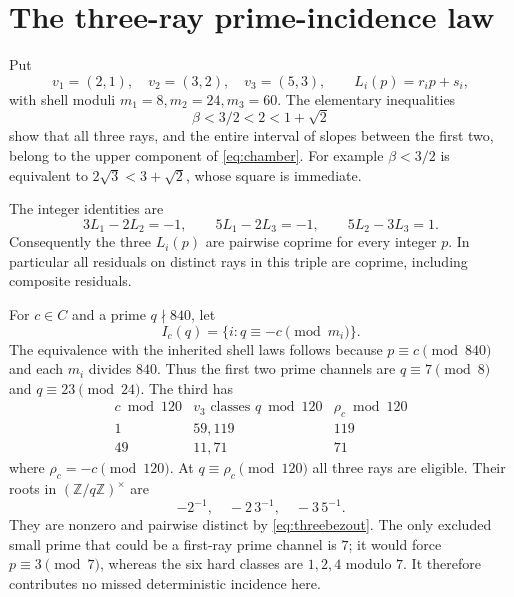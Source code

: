 \documentclass[11pt]{article}
\theoremstyle{remark}\newtheorem{remark}[theorem]{Remark}
\newcommand{\Z}{\mathbb Z}
\begin{document}
\section{The three-ray prime-incidence law}\label{sec:local}
Put
\[
 v_1=(2,1),\quad v_2=(3,2),\quad v_3=(5,3),\qquad
 L_i(p)=r_ip+s_i,
\]
with shell moduli $m_1=8,m_2=24,m_3=60$. The elementary inequalities
\[
 \beta<3/2<2<1+\sqrt2
\]
show that all three rays, and the entire interval of slopes between the first two, belong to the upper component of \eqref{eq:chamber}.
For example $\beta<3/2$ is equivalent to $2\sqrt3<3+\sqrt2$, whose square is immediate.

The integer identities are
\begin{equation}\label{eq:threebezout}
 3L_1-2L_2=-1,\qquad5L_1-2L_3=-1,\qquad5L_2-3L_3=1.
\end{equation}
Consequently the three $L_i(p)$ are pairwise coprime for every integer $p$. In particular all residuals on distinct rays in this triple are coprime, including composite residuals.

For $c\in C$ and a prime $q\nmid840$, let
\[
 I_c(q)=\{i:q\equiv-c\pmod{m_i}\}.
\]
The equivalence with the inherited shell laws follows because $p\equiv c\pmod{840}$ and each $m_i$ divides $840$. Thus the first two prime channels are $q\equiv7\pmod8$ and $q\equiv23\pmod{24}$. The third has
\[
 \begin{array}{c|c|c}
 c\bmod120&v_3\text{ classes }q\bmod120&\rho_c\bmod120\\\hline
 1&59,119&119\\
 49&11,71&71
 \end{array}
\]
where $\rho_c=-c\pmod{120}$. At $q\equiv\rho_c\pmod{120}$ all three rays are eligible. Their roots in $(\Z/q\Z)^\times$ are
\begin{equation}\label{eq:roots}
 -2^{-1},\quad-2\,3^{-1},\quad-3\,5^{-1}.
\end{equation}
They are nonzero and pairwise distinct by \eqref{eq:threebezout}. The only excluded small prime that could be a first-ray prime channel is $7$; it would force $p\equiv3\pmod7$, whereas the six hard classes are $1,2,4$ modulo $7$. It therefore contributes no missed deterministic incidence here.
\end{document}
